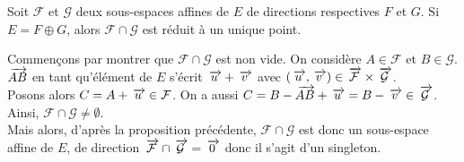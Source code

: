 \documentclass{magnolia}
\begin{document}
\begin{proposition}
Soit $\mathcal{F}$ et $\mathcal{G}$ deux sous-espaces affines de $E$ de directions
respectives $F$ et $G$. Si $E=F\oplus G$, alors $\mathcal{F}\cap\mathcal{G}$ est réduit à
un unique point.
\end{proposition}

\begin{preuve}
Commençons par montrer que $\mathcal{F}\cap\mathcal{G}$ est non vide. On considère $A\in \mathcal{F}$ et $B\in \mathcal{G}$. $\kern 2pt\overrightarrow{\kern -2ptAB}$ en tant qu'élément de $E$ s'écrit $\kern 2pt\overrightarrow{\kern -2ptu}+\kern 2pt\overrightarrow{\kern -2ptv}$ avec $(\kern 2pt\overrightarrow{\kern -2ptu},\kern 2pt\overrightarrow{\kern -2ptv})\in \kern 2pt\overrightarrow{\kern -2pt\mathcal{F}}\times\kern 2pt\overrightarrow{\kern -2pt\mathcal{G}}$.\\
Posons alors $C=A+\kern 2pt\overrightarrow{\kern -2ptu} \in \mathcal{F}$. On a aussi $C=B-\kern 2pt\overrightarrow{\kern -2ptAB}+\kern 2pt\overrightarrow{\kern -2ptu}=B-\kern 2pt\overrightarrow{\kern -2ptv} \in \kern 2pt\overrightarrow{\kern -2pt\mathcal{G}}$. Ainsi, $\mathcal{F}\cap\mathcal{G}\neq \emptyset$.\\

Mais alors, d'après la proposition précédente, $\mathcal{F}\cap\mathcal{G}$ est donc un sous-espace affine de $E$, de direction $\kern 2pt\overrightarrow{\kern -2pt\mathcal{F}}\cap\kern 2pt\overrightarrow{\kern -2pt\mathcal{G}}={\kern 2pt\overrightarrow{\kern -2pt0}}$ donc il s'agit d'un singleton.
\end{preuve}
\end{document}
